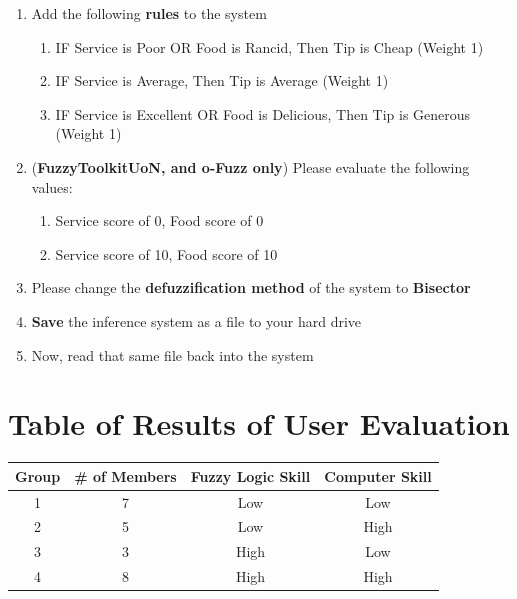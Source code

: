 \begin{enumerate}
\begin{enumerate}
\begin{tabular}{ll}
	\end{tabular}			
	\end{enumerate}	
\item Add the following \textbf{rules} to the system
	\begin{enumerate}
	\item IF Service is Poor OR Food is Rancid, Then Tip is Cheap (Weight 1)
	\item IF Service is Average, Then Tip is Average (Weight 1)
	\item IF Service is Excellent OR Food is Delicious, Then Tip is Generous (Weight 1)
	\end{enumerate}
\item (\textbf{FuzzyToolkitUoN, and o-Fuzz only}) Please evaluate the following values:
	\begin{enumerate}
	\item Service score of 0, Food score of 0
	\item Service score of 10, Food score of 10
	\end{enumerate}
\item Please change the \textbf{defuzzification method}	of the system to \textbf{Bisector}
\item \textbf{Save} the inference system as a file to your hard drive
\item Now, read that same file back into the system
\end{enumerate}

\newpage
\section{Table of Results of User Evaluation}
\label{app-torous}



\begin{center}
\begin{tabular}{cccc}
\hline
\textbf{Group} 	& \textbf{\# of Members} & \textbf{Fuzzy Logic Skill} & \textbf{Computer Skill} \\
\hline
1				& 7 						 & Low			& Low		\\	
2				& 5  						 & Low			& High		\\
3				& 3 						 & High			& Low 		\\
4				& 8 						 & High 		& High		\\
\hline
\end{tabular}
\end{center}

